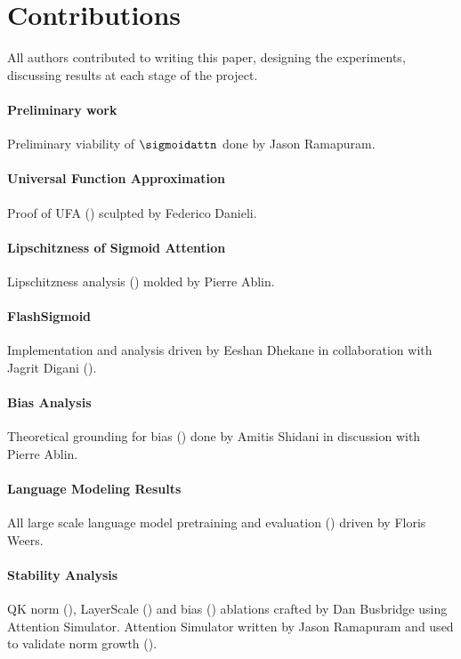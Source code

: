\newpage
\section{Contributions}
\label{sec:attribution}

All authors contributed to writing this paper, designing the experiments, discussing results at each stage of the project.

\paragraph{Preliminary work} 
Preliminary viability of $\sigmoidattn$ done by Jason Ramapuram.

\paragraph{Universal Function Approximation} 
Proof of UFA () sculpted by Federico Danieli.

\paragraph{Lipschitzness of Sigmoid Attention}
Lipschitzness analysis () molded by Pierre Ablin.

\paragraph{FlashSigmoid}
Implementation and analysis driven by Eeshan Dhekane in collaboration with Jagrit Digani ().

\paragraph{Bias Analysis}
Theoretical grounding for bias () done by Amitis Shidani in discussion with Pierre Ablin.

\paragraph{Language Modeling Results}
All large scale language model pretraining and evaluation () driven by Floris Weers.

\paragraph{Stability Analysis}
QK norm (), LayerScale () and bias () ablations crafted by Dan Busbridge using Attention Simulator. Attention Simulator written by Jason Ramapuram and used to validate norm growth ().

